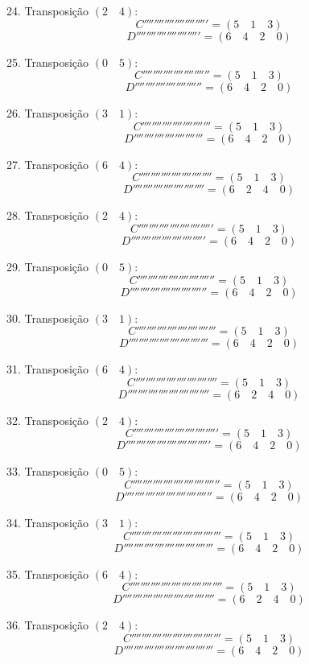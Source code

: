 24. Transposição $(2 \quad 4)$:
    \[ C''''''''''''''''''''''''' = (5 \quad 1 \quad 3) \]
    \[ D''''''''''''''''''''''''' = (6 \quad 4 \quad 2 \quad 0) \]

25. Transposição $(0 \quad 5)$:
    \[ C'''''''''''''''''''''''''' = (5 \quad 1 \quad 3) \]
    \[ D'''''''''''''''''''''''''' = (6 \quad 4 \quad 2 \quad 0) \]

26. Transposição $(3 \quad 1)$:
    \[ C''''''''''''''''''''''''''' = (5 \quad 1 \quad 3) \]
    \[ D''''''''''''''''''''''''''' = (6 \quad 4 \quad 2 \quad 0) \]

27. Transposição $(6 \quad 4)$:
    \[ C'''''''''''''''''''''''''''' = (5 \quad 1 \quad 3) \]
    \[ D'''''''''''''''''''''''''''' = (6 \quad 2 \quad 4 \quad 0) \]

28. Transposição $(2 \quad 4)$:
    \[ C''''''''''''''''''''''''''''' = (5 \quad 1 \quad 3) \]
    \[ D''''''''''''''''''''''''''''' = (6 \quad 4 \quad 2 \quad 0) \]

29. Transposição $(0 \quad 5)$:
    \[ C'''''''''''''''''''''''''''''' = (5 \quad 1 \quad 3) \]
    \[ D'''''''''''''''''''''''''''''' = (6 \quad 4 \quad 2 \quad 0) \]

30. Transposição $(3 \quad 1)$:
    \[ C''''''''''''''''''''''''''''''' = (5 \quad 1 \quad 3) \]
    \[ D''''''''''''''''''''''''''''''' = (6 \quad 4 \quad 2 \quad 0) \]

31. Transposição $(6 \quad 4)$:
    \[ C'''''''''''''''''''''''''''''''' = (5 \quad 1 \quad 3) \]
    \[ D'''''''''''''''''''''''''''''''' = (6 \quad 2 \quad 4 \quad 0) \]

32. Transposição $(2 \quad 4)$:
    \[ C''''''''''''''''''''''''''''''''' = (5 \quad 1 \quad 3) \]
    \[ D''''''''''''''''''''''''''''''''' = (6 \quad 4 \quad 2 \quad 0) \]

33. Transposição $(0 \quad 5)$:
    \[ C'''''''''''''''''''''''''''''''''' = (5 \quad 1 \quad 3) \]
    \[ D'''''''''''''''''''''''''''''''''' = (6 \quad 4 \quad 2 \quad 0) \]

34. Transposição $(3 \quad 1)$:
    \[ C''''''''''''''''''''''''''''''''''' = (5 \quad 1 \quad 3) \]
    \[ D''''''''''''''''''''''''''''''''''' = (6 \quad 4 \quad 2 \quad 0) \]

35. Transposição $(6 \quad 4)$:
    \[ C'''''''''''''''''''''''''''''''''''' = (5 \quad 1 \quad 3) \]
    \[ D'''''''''''''''''''''''''''''''''''' = (6 \quad 2 \quad 4 \quad 0) \]

36. Transposição $(2 \quad 4)$:
    \[ C''''''''''''''''''''''''''''''''''' = (5 \quad 1 \quad 3) \]
    \[ D''''''''''''''''''''''''''''''''''' = (6 \quad 4 \quad 2 \quad 0) \]

